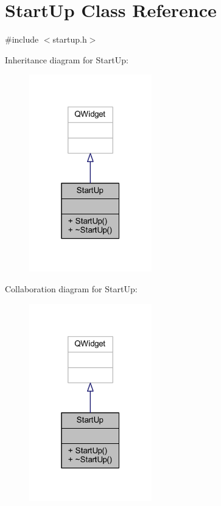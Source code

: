 \hypertarget{class_start_up}{}\section{Start\+Up Class Reference}
\label{class_start_up}


{\ttfamily \#include $<$startup.\+h$>$}



Inheritance diagram for Start\+Up\+:
\nopagebreak
\begin{figure}[H]
\begin{center}
\leavevmode
\includegraphics[width=151pt]{class_start_up__inherit__graph}
\end{center}
\end{figure}


Collaboration diagram for Start\+Up\+:
\nopagebreak
\begin{figure}[H]
\begin{center}
\leavevmode
\includegraphics[width=151pt]{class_start_up__coll__graph}
\end{center}
\end{figure}
